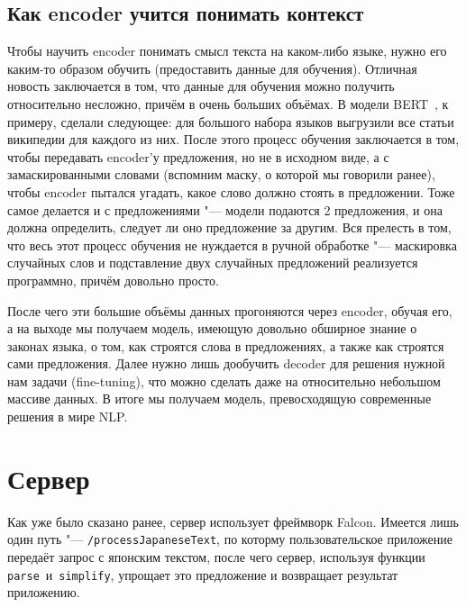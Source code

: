 \subsection{Как encoder учится понимать контекст}


Чтобы научить encoder понимать смысл текста на каком-либо языке, нужно его каким-то образом обучить (предоставить данные для обучения).
Отличная новость заключается в том, что данные для обучения можно получить относительно несложно, причём в очень больших объёмах.
В модели BERT~\cite{BERTmodel}, к примеру, сделали следующее: для большого набора языков выгрузили все статьи википедии для каждого из них.
После этого процесс обучения заключается в том, чтобы передавать encoder'у предложения, но не в исходном виде, а с замаскированными словами (вспомним маску, о которой мы говорили ранее), чтобы encoder пытался угадать, какое слово должно стоять в предложении.
Тоже самое делается и с предложениями "--- модели подаются 2 предложения, и она должна определить, следует ли оно предложение за другим.
Вся прелесть в том, что весь этот процесс обучения не нуждается в ручной обработке "--- маскировка случайных слов и подставление двух случайных предложений реализуется программно, причём довольно просто.

После чего эти большие объёмы данных прогоняются через encoder, обучая его, а на выходе мы получаем модель, имеющую довольно обширное знание о законах языка, о том, как строятся слова в предложениях, а также как строятся сами предложения. Далее нужно лишь дообучить decoder для решения нужной нам задачи (fine-tuning), что можно сделать даже на относительно небольшом массиве данных. В итоге мы получаем модель, превосходящую современные решения в мире NLP.


\section{Сервер}


Как уже было сказано ранее, сервер использует фреймворк Falcon.
Имеется лишь один путь "--- \texttt{/processJapaneseText}, по которму пользовательское приложение передаёт запрос с японским текстом, после чего сервер, используя функции \texttt{parse}~и~\texttt{simplify}, упрощает это предложение и возвращает результат приложению.


